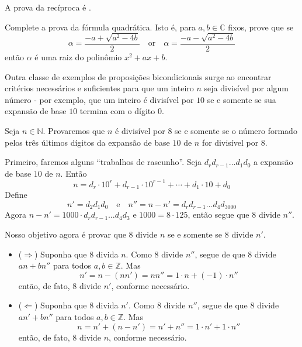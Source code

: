 \begin{itemizar}
\begin{cproof}
A prova da recíproca é .
\end{cproof}

\begin{exercise}
\label{exQuadraticFormulaConverse}
Complete a prova da fórmula quadrática. Isto é, para $a,b \in \mathbb{C}$ fixos, prove que se
\[
\alpha = \frac{-a+\sqrt{a^2-4b}}{2} \quad \text{or} \quad \alpha =\frac{-a-\sqrt{a^2-4b}}{2}
\]
então $\alpha$ é uma raiz do polinômio $x^2+ax+b$.
\end{exercise}

Outra classe de exemplos de proposições bicondicionais surge ao encontrar critérios necessários e suficientes para que um inteiro $n$ seja divisível por algum número - por exemplo, que um inteiro é divisível por $10$ se e somente se sua expansão de base $10$ termina com o dígito $0$.

\begin{example}
\label{exTestForDivisibilityByEight}
Seja $n \in \mathbb{N}$. Provaremos que $n$ é divisível por $8$ se e somente se o número formado pelos três últimos dígitos da expansão de base $10$ de $n$ for divisível por $8$.

Primeiro, faremos alguns “trabalhos de rascunho”. Seja $d_rd_{r-1}\dots{}d_1d_0$ a expansão de base $10$ de $n$. Então
\[
n = d_r \cdot 10^r + d_{r-1} \cdot 10^{r-1} + \cdots + d_1 \cdot 10 + d_0
\]
Define
\[
n' = d_2d_1d_0 \quad \text{e} \quad n'' = n-n' = d_rd_{r-1}\dots{}d_4d_3000
\]
Agora $n-n' = 1000 \cdot d_rd_{r-1} \dots d_4d_3$ e $1000 = 8 \cdot 125$, então segue que $8$ divide $n''$.

Nosso objetivo agora é provar que $8$ divide $n$ se e somente se $8$ divide $n'$.
\begin{itemize}
\item ($\Rightarrow$) Suponha que $8$ divida $n$. Como $8$ divide $n''$, segue de  que $8$ divide $an+bn''$ para todos $a,b \in \mathbb{Z}$. Mas
\[
n' = n-(nn') = nn'' = 1 \cdot n + (-1) \cdot n''
\]
então, de fato, $8$ divide $n'$, conforme necessário.
\item ($\Leftarrow$) Suponha que $8$ divida $n'$. Como $8$ divide $n''$, segue de  que $8$ divide $an'+bn''$ para todos $a,b \in \mathbb{Z}$. Mas
\[
n = n'+(n-n') = n'+n'' = 1 \cdot n' + 1 \cdot n''
\]
então, de fato, $8$ divide $n$, conforme necessário.
\end{itemize}
\end{example}


\end{itemizar}
